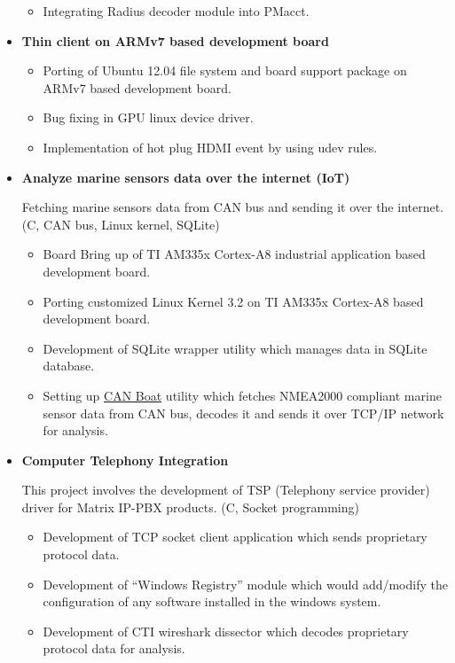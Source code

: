 \documentclass[letterpaper,10pt]{article}
\newcommand{\resitem}[1]{\item #1 \vspace{-2pt}}
\begin{document}
\begin{itemize}
\begin{itemize}
		\resitem{Integrating Radius decoder module into PMacct.}
	\end{itemize}
	
\item
    \textbf{Thin client on ARMv7 based development board}
    
	\begin{itemize}
	    \resitem{Porting of Ubuntu 12.04 file system and board support package on ARMv7 based development board.}
	    
	    \resitem{Bug fixing in GPU linux device driver.}
	    
	    \resitem{Implementation of hot plug HDMI event by using udev rules.}
	    
	\end{itemize}
	
\item
    \textbf{Analyze marine sensors data over the internet (IoT)}
	
    Fetching marine sensors data from CAN bus and sending it over the internet. (C, CAN bus, Linux kernel, SQLite)
    
	\begin{itemize}
	    \resitem{Board Bring up of TI AM335x Cortex-A8 industrial application based development board.}
	
	    \resitem{Porting customized Linux Kernel 3.2 on TI AM335x Cortex-A8 based development board.}
	    
	    \resitem{Development of SQLite wrapper utility which manages data in SQLite database.}
	    
	    \resitem{Setting up \href{https://github.com/mehul-m-prajapati/canboat}{CAN Boat} utility which fetches NMEA2000 compliant marine sensor data from CAN bus, decodes it and sends it over TCP/IP network for analysis.}

	\end{itemize}
	
\item
   \textbf{Computer Telephony Integration}
    
    This project involves the development of TSP (Telephony service provider) driver for Matrix IP-PBX products. (C, Socket programming)
    
	\begin{itemize}
	    \resitem{Development of TCP socket client application which sends proprietary protocol data.}
	    
	    \resitem{Development of “Windows Registry” module which would add/modify the configuration of any software installed in the windows system.}
	    
	    \resitem{Development of CTI wireshark dissector which decodes proprietary protocol data for analysis.}
	    
	\end{itemize}

\end{itemize}
\end{document}
